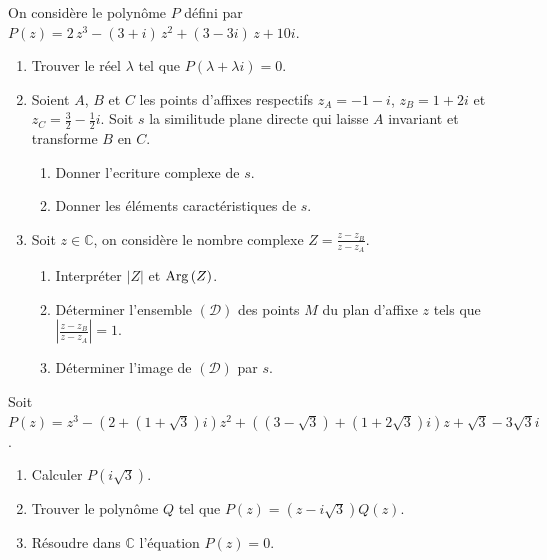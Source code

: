 \begin{exo}
      On consid\`ere le polyn\^ome $P$ d\'efini par 
      $P(z) = 2 \, z^{3} - \left(3 + i\right) \, z^{2} + \left( 3 - 3 i \right) \, z + 10 i$.
      \begin{enumerate}
            \item Trouver le r\'eel $\lambda$ tel que $P(\lambda + \lambda i) = 0$.
            \item Soient $A$, $B$ et $C$ les points d'affixes respectifs 
                  $z_A = -1-i$, $z_B = 1+2i$ et $z_C = \frac{3}{2}-\frac{1}{2}i$.
                  Soit $s$ la similitude plane directe qui laisse $A$ invariant et transforme $B$ en $C$.
                  \begin{enumerate}
                        \item Donner l'ecriture complexe de $s$.
                        \item Donner les \'el\'ements caract\'eristiques de $s$.
                  \end{enumerate}
            \item Soit $z\in\mathbb{C}$, on consid\`ere le nombre complexe $Z = \frac{z - z_B}{z - z_A}$.
                  \begin{enumerate}
                        \item Interpr\'eter $|Z|$ et $\mathrm{Arg}\left( Z \right)$.
                        \item D\'eterminer l'ensemble $(\mathscr{D})$ des points $M$ du plan d'affixe $z$ tels que 
                              $|\frac{z - z_B}{z - z_A}| = 1$.
                        \item D\'eterminer l'image de $(\mathscr{D})$ par $s$.
                  \end{enumerate}
      \end{enumerate}
\end{exo}
\begin{exo}
	Soit $P(z) = z^3 - (2 + (1+\sqrt{3})i) z^2 + ((3-\sqrt{3}) + (1+2\sqrt{3})i) z + \sqrt{3} - 3 \sqrt{3} i$.
	\begin{enumerate}
		\item Calculer $P(i\sqrt{3})$.
		\item Trouver le polyn\^ome $Q$ tel que $P(z) = (z-i\sqrt{3}) Q(z)$.
		\item R\'esoudre dans $\mathbb{C}$ l'\'equation $P(z) = 0$.
	\end{enumerate}
\end{exo}
